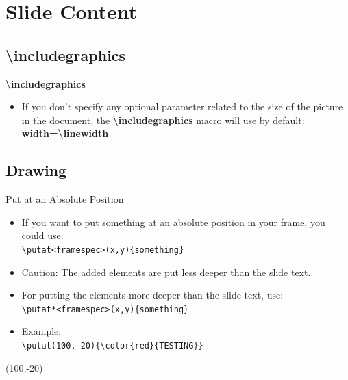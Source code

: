 \documentclass[english,sectioncirclenumberstyle]{le2iutbmbeamer}
\begin{document}
\section{Slide Content}
\tableofcontentslide[sectionstyle={show/shaded},subsectionstyle={show/show/hide},subsubsectionstyle={hide/hide/hide/hide},sections={3-}]

\subsection{{\textbackslash}includegraphics}
\tableofcontentslide[sectionstyle={show/shaded},subsectionstyle={show/shaded/hide},subsubsectionstyle={hide/hide/hide/hide},sections={3-}]

\begin{frame}{\textbf{{\textbackslash}includegraphics}}
	\begin{itemize}
	\vspace{2em}
	\item If you don't specify any optional parameter related to the size of the picture in the document, the \textbf{{\textbackslash}includegraphics} macro will use by default: \\
		\textbf{width={\textbackslash}linewidth}
	\end{itemize}
\end{frame}

\subsection{Drawing}
\tableofcontentslide[sectionstyle={show/shaded},subsectionstyle={show/shaded/hide},subsubsectionstyle={hide/hide/hide/hide},sections={3-}]

\begin{frame}{Put at an Absolute Position}
	\begin{itemize}
	\item If you want to put something at an absolute position in your frame, you could use: \\
		\texttt{{\textbackslash}putat<framespec>(x,y)\{something\}}
	\item \alert{Caution: The added elements are put less deeper than the slide text.}
	\item For putting the elements more deeper than the slide text, use: \\
		\texttt{{\textbackslash}putat*<framespec>(x,y)\{something\}}
	\vspace{1em}
	\item Example: \\
		\texttt{{\textbackslash}putat(100,-20)\{{\textbackslash}color\{red\}\{TESTING\}\}}
	\end{itemize}
	\putat(100,-20){\color{red}{TESTING}}
\end{frame}
\end{document}
